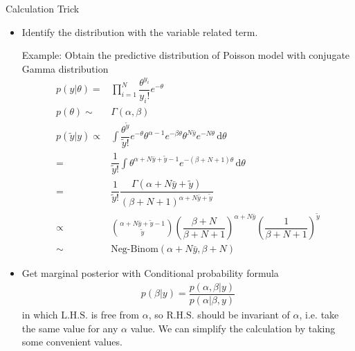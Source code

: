 \begin{point}
    Calculation Trick
\end{point}
\begin{itemize}[topsep=2pt,itemsep=0pt]
    \item Identify the distribution with the variable related term.
    
    Example: Obtain the predictive distribution of Poisson model with conjugate Gamma distribution
    \begin{align}
        p(y|\theta )=&\prod_{i=1}^N\dfrac{ \theta ^{y_i} }{ y_i! }e^{-\theta }\\
        p(\theta )\sim &\Gamma (\alpha,\beta )\\ 
        p(\tilde{y}|y)\propto&\int \dfrac{ \theta ^{\tilde{y}} }{ \tilde{y}! }e^{-\theta } \theta ^{\alpha -1}e^{-\beta \theta }\theta ^{N\bar{y}}e^{-N\theta }  \,\mathrm{d}\theta \\
        = & \dfrac{ 1 }{ \tilde{y}! }\int\theta ^{\alpha +N\bar{y}+\tilde{y} -1}e^{-(\beta+N +1)\theta }  \,\mathrm{d}\theta\\
        =&\dfrac{ 1 }{ \tilde{y}! }\dfrac{ \Gamma (\alpha +N\bar{y}+\tilde{y}) }{ (\beta+N +1)^{\alpha +N\bar{y}+\tilde{y}} } \\
        \propto &\binom{\alpha +N\bar{y}+\tilde{y}-1 }{\tilde{y}}\left( \dfrac{ \beta+N  }{ \beta+N +1 }  \right)^{\alpha +N\bar{y}}\left( \dfrac{ 1 }{ \beta+N +1 } \right)^{\tilde{y}}\\
        \sim & \mathrm{Neg}\text{-}\mathrm{Binom}(\alpha +N\bar{y}, \beta+N )
    \end{align}
    \item Get marginal posterior with Conditional probability formula
    \begin{align}
        p(\beta |y)=\dfrac{ p(\alpha ,\beta |y) }{ p(\alpha |\beta ,y) }  
    \end{align}
    in which $ \mathrm{ L.H.S. }  $ is free from $ \alpha  $, so $ \mathrm{ R.H.S. }  $ should be invariant of $ \alpha  $, i.e. take the same value for any $ \alpha  $ value. We can simplify the calculation by taking some convenient values.


\end{itemize}
